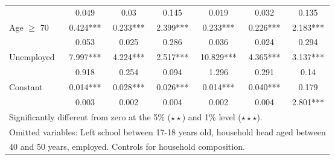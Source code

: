 \begin{table}
\begin{tabular}{l|ccc|ccc}
                    	&	       0.049   	&	0.03	&	0.145	&	       0.019   	&	0.032	&	0.135	\\				
Age $\geq$ 70	&	       0.424***	&	       0.233***	&	       2.399***	&	       0.233***	&	       0.226***	&	       2.183***	\\				
                    	&	       0.053   	&	0.025	&	0.286	&	       0.036   	&	0.024	&	0.294	\\				
Unemployed	&	       7.997***	&	       4.224***	&	       2.517***	&	      10.829***	&	       4.365***	&	       3.137***	\\				
	&	       0.918   	&	0.254	&	0.094	&	       1.296   	&	0.291	&	0.14	\\				
Constant            	&	       0.014***	&	       0.028***	&	       0.026***	&	       0.014***	&	       0.040***	&	0.179	\\				
                    	&	       0.003   	&	0.002	&	0.004	&	       0.002   	&	0.004	&	       2.801***	\\
\hline\hline
\multicolumn{7}{l}{Significantly different from zero at the 5\% ($\star\star$) and 1\% level ($\star\star\star$).} \\
\multicolumn{7}{l}{Omitted variables: Left school between 17-18 years old, household head aged between} \\
\multicolumn{7}{l}{40 and 50 years, employed. Controls for household composition.}
\end{tabular}
\end{table}


